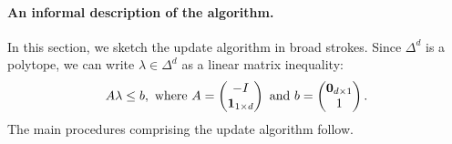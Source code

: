 \documentclass[eikonal.tex]{subfiles}
\begin{document}
\paragraph{An informal description of the algorithm.} In this section,
we sketch the update algorithm in broad strokes. Since $\Delta^d$ is a
polytope, we can write $\lambda \in \Delta^d$ as a linear matrix
inequality:
\begin{align*}
  A\lambda \leq b, \mbox{ where } A = \begin{pmatrix}
    -I \\ \boldsymbol{1}_{1 \times d}
  \end{pmatrix} \mbox{ and } b = \begin{pmatrix}
    \boldsymbol{0}_{d \times 1} \\ 1
  \end{pmatrix}.
\end{align*}
The main procedures comprising the update algorithm follow.
\end{document}
